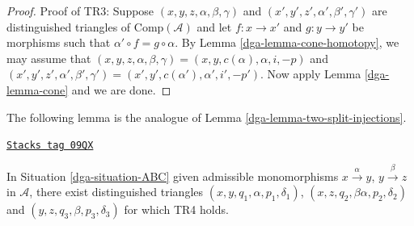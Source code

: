 \begin{proof}
\medskip\noindent
Proof of TR3: Suppose $(x,y,z, \alpha,\beta,\gamma)$ and
$(x',y',z',\alpha',\beta',\gamma')$ are distinguished triangles
of $\text{Comp}(\mathcal{A})$ and let $f: x \to x'$ and
$g: y \to y'$ be morphisms such that
$\alpha' \circ f = g \circ \alpha$. By
Lemma \ref{dga-lemma-cone-homotopy}, we may assume that
$(x,y,z,\alpha,\beta,\gamma)= (x,y,c(\alpha),\alpha, i, -p)$
and $(x',y',z', \alpha',\beta',\gamma')= (x',y',c(\alpha'), \alpha',i',-p')$.
Now apply Lemma \ref{dga-lemma-cone}
and we are done.
\end{proof}

The following lemma is the analogue of Lemma \ref{dga-lemma-two-split-injections}.

\begin{lemma}
\label{dga-lemma-dgc-analogue-tr4}
\href{https://stacks.math.columbia.edu/tag/09QX}{\texttt{Stacks tag 09QX}}

In Situation \ref{dga-situation-ABC} given admissible monomorphisms
$x \xrightarrow{\alpha} y$, $y \xrightarrow{\beta} z$ in $\mathcal{A}$,
there exist distinguished triangles
$(x,y,q_1,\alpha,p_1,\delta_1)$, $(x,z,q_2,\beta\alpha,p_2,\delta_2)$
and $(y,z,q_3,\beta,p_3,\delta_3)$ for which TR4 holds.
\end{lemma}

